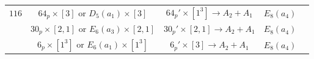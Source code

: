 \documentclass[reqno,12pt]{amsart}
\numberwithin{equation}{section}
\theoremstyle{plain}
\theoremstyle{definition}
\begin{document}
\begin{table}[htbp]
\begin{tabular}{|c|c|c|c|c|}
       $ 116 $  &  $64_p\times [3] $ or $D_5(a_1)\times [3]$ &  $64_{p}'\times[1^3]\rightarrow A_2+A_1 $     &   $ E_8(a_4)$    \\  
        
         &  $30_p\times [2,1] $ or $E_6(a_3)\times [2,1]$ &  $30_{p}'\times[2,1]\rightarrow A_2 +A_1$     &   $ E_8(a_4)$  \\
         &  $6_p\times [1^3] $ or $E_6(a_1)\times [1^3]$ &  $6_{p}'\times[3]\rightarrow A_2 +A_1$     &   $ E_8(a_4)$\\
         \hline
\end{tabular}
	\bigskip
	
\end{table}
\end{document}
